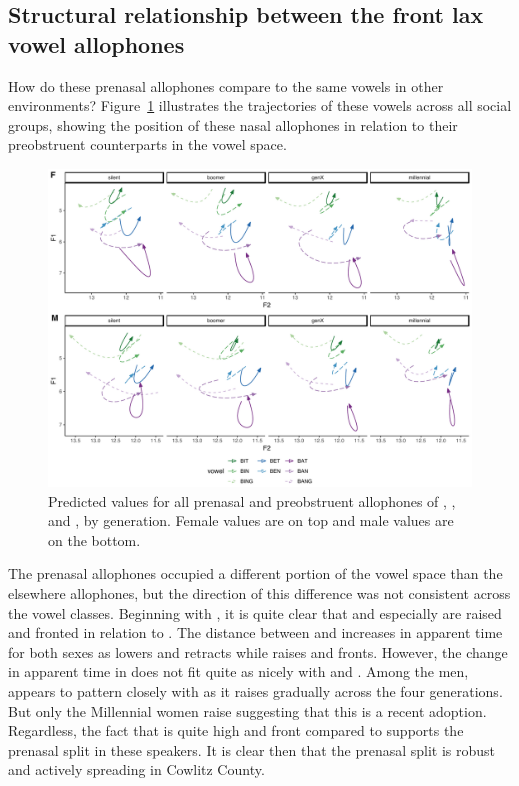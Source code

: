 \subsection{Structural relationship between the front lax vowel allophones}

How do these prenasal allophones compare to the same vowels in other environments? Figure~\ref{fig:combined_nasal_plot} illustrates the trajectories of these vowels across all social groups, showing the position of these nasal allophones in relation to their preobstruent counterparts in the vowel space.

\begin{figure}[p]
    \centering
    \includegraphics[angle=90, origin=c, width = 6in]{Figures/other_figures/combined_nasal_plot.pdf}
    \caption[Predicted values for all prenasal and preobstruent allophones]{Predicted values for all prenasal and preobstruent allophones of \kit, \dress, and \trap, by generation. Female values are on top and male values are on the bottom.}
    \label{fig:combined_nasal_plot}
\end{figure}

The prenasal allophones occupied a different portion of the vowel space than the elsewhere allophones, but the direction of this difference was not consistent across the vowel classes. Beginning with \trap, it is quite clear that \ban and especially \bang are raised and fronted in relation to \bat. The distance between \ban and \bat increases in apparent time for both sexes as \bat lowers and retracts while \ban raises and fronts. However, the change in apparent time in \bang does not fit quite as nicely with \bat and \ban. Among the men, \bang appears to pattern closely with \ban as it raises gradually across the four generations. But only the Millennial women raise \bang suggesting that this is a recent adoption. Regardless, the fact that \bang is quite high and front compared to \bat supports the prenasal split in these speakers. It is clear then that the prenasal split is robust and actively spreading in Cowlitz County.

